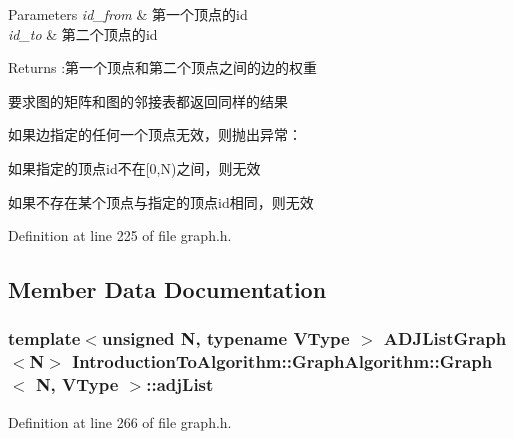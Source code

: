 \begin{DoxyParams}{Parameters}
{\em id\+\_\+from} & 第一个顶点的{\ttfamily id} \\
\hline
{\em id\+\_\+to} & 第二个顶点的{\ttfamily id} \\
\hline
\end{DoxyParams}
\begin{DoxyReturn}{Returns}
\+:第一个顶点和第二个顶点之间的边的权重
\end{DoxyReturn}
要求图的矩阵和图的邻接表都返回同样的结果

如果边指定的任何一个顶点无效，则抛出异常：


\begin{DoxyItemize}
\item 如果指定的顶点{\ttfamily id}不在{\ttfamily \mbox{[}0,N)}之间，则无效
\item 如果不存在某个顶点与指定的顶点{\ttfamily id}相同，则无效 
\end{DoxyItemize}

Definition at line 225 of file graph.\+h.



\subsection{Member Data Documentation}
\hypertarget{struct_introduction_to_algorithm_1_1_graph_algorithm_1_1_graph_a4442db9dd1bbb7fe543353df4fa1ba9f}{}
\subsubsection[{adj\+List}]{\setlength{\rightskip}{0pt plus 5cm}template$<$unsigned N, typename V\+Type $>$ {\bf A\+D\+J\+List\+Graph}$<$N$>$ {\bf Introduction\+To\+Algorithm\+::\+Graph\+Algorithm\+::\+Graph}$<$ N, V\+Type $>$\+::adj\+List}\label{struct_introduction_to_algorithm_1_1_graph_algorithm_1_1_graph_a4442db9dd1bbb7fe543353df4fa1ba9f}


Definition at line 266 of file graph.\+h.

\hypertarget{struct_introduction_to_algorithm_1_1_graph_algorithm_1_1_graph_a498323460ec613f12e1039afdca6c10a}{}
